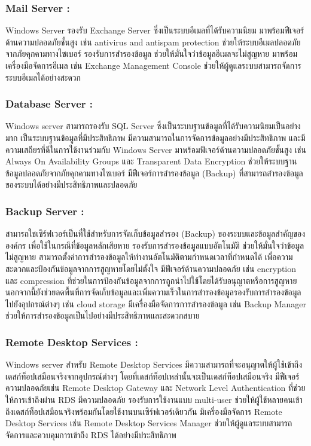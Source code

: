 \hspace{0cm}\subsubsection{Mail Server :}Windows Server รองรับ Exchange Server ซึ่งเป็นระบบอีเมลที่ได้รับความนิยม 
มาพร้อมฟีเจอร์ด้านความปลอดภัยชั้นสูง เช่น antivirus and antispam protection ช่วยให้ระบบอีเมลปลอดภัยจากภัยคุกคามทางไซเบอร์ 
รองรับการสำรองข้อมูล ช่วยให้มั่นใจว่าข้อมูลอีเมลจะไม่สูญหาย 
มาพร้อมเครื่องมือจัดการอีเมล เช่น Exchange Management Console ช่วยให้ผู้ดูแลระบบสามารถจัดการระบบอีเมลได้อย่างสะดวก 

\hspace{0cm}\subsubsection{Database Server :}Windows server สามารถรองรับ SQL Server ซึ่งเป็นระบบฐานข้อมูลที่ได้รับความนิยมเป็นอย่างมาก เป็นระบบฐานข้อมูลที่มีประสิทธิภาพ มีความสามารถในการจัดการข้อมูลอย่างมีประสิทธิภาพ และมีความเสถียรที่ดีในการใช้งานร่วมกับ Windows Server 
มาพร้อมฟีเจอร์ด้านความปลอดภัยชั้นสูง เช่น Always On Availability Groups และ Transparent Data Encryption ช่วยให้ระบบฐานข้อมูลปลอดภัยจากภัยคุกคามทางไซเบอร์ 
มีฟีเจอร์การสำรองข้อมูล (Backup) ที่สามารถสำรองข้อมูลของระบบได้อย่างมีประสิทธิภาพและปลอดภัย 

\hspace{0cm}\subsubsection{Backup Server :}สามารถใชเซิร์ฟเวอร์เป็นที่ใช้สำหรับการจัดเก็บข้อมูลสำรอง (Backup) ของระบบและข้อมูลสำคัญขององค์กร เพื่อใช้ในกรณีที่ข้อมูลหลักเสียหาย 
รองรับการสำรองข้อมูลแบบอัตโนมัติ ช่วยให้มั่นใจว่าข้อมูลไม่สูญหาย สามารถตั้งค่าการสำรองข้อมูลให้ทำงานอัตโนมัติตามกำหนดเวลาที่กำหนดได้ เพื่อความสะดวกและป้องกันข้อมูลจากการสูญหายโดยไม่ตั้งใจ 
มีฟีเจอร์ด้านความปลอดภัย เช่น encryption และ compression ที่ช่วยในการป้องกันข้อมูลจากการถูกนำไปใช้โดยได้รับอนุญาตหรือการสูญหาย นอกจากนี้ยังช่วยลดพื้นที่การจัดเก็บข้อมูลและเพิ่มความเร็วในการสำรองข้อมูลรองรับการสำรองข้อมูลไปยังอุปกรณ์ต่างๆ เช่น cloud storage 
มีเครื่องมือจัดการการสำรองข้อมูล เช่น Backup Manager ช่วยให้การสำรองข้อมูลเป็นไปอย่างมีประสิทธิภาพและสะดวกสบาย 

\hspace{0cm}\subsubsection{Remote Desktop Services :} Windows server สำหรับ Remote Desktop Services 
มีความสามารถที่จะอนุญาตให้ผู้ใช้เข้าถึงเดสก์ท็อปเสมือนจริงจากอุปกรณ์ต่างๆ โดยที่เดสก์ท็อปเหล่านั้นจะเป็นเดสก์ท็อปเสมือนจริง 
มีฟีเจอร์ความปลอดภัยเช่น Remote Desktop Gateway และ Network Level Authentication ที่ช่วยให้การเข้าถึงผ่าน RDS มีความปลอดภัย 
รองรับการใช้งานแบบ multi-user ช่วยให้ผู้ใช้หลายคนเข้าถึงเดสก์ท็อปเสมือนจริงพร้อมกันโดยใช้งานบนเซิร์ฟเวอร์เดียวกัน 
มีเครื่องมือจัดการ Remote Desktop Services เช่น Remote Desktop Services Manager ช่วยให้ผู้ดูแลระบบสามารถจัดการและควบคุมการเข้าถึง RDS ได้อย่างมีประสิทธิภาพ   


